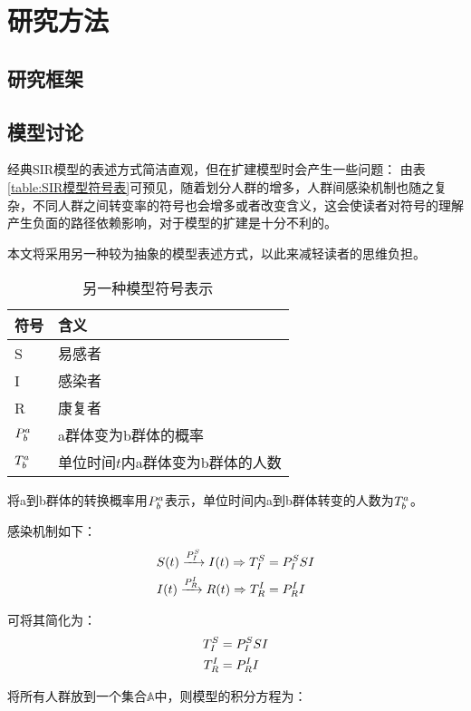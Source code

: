 \section{研究方法}
\subsection{研究框架}
\subsection{模型讨论}
\par 经典SIR模型的表述方式简洁直观，但在扩建模型时会产生一些问题：
由表\ref{table:SIR模型符号表}可预见，随着划分人群的增多，人群间感染机制也随之复杂，不同人群之间转变率的符号也会增多或者改变含义，这会使读者对符号的理解产生负面的路径依赖影响，对于模型的扩建是十分不利的。
\par 本文将采用另一种较为抽象的模型表述方式，以此来减轻读者的思维负担。
\begin{table}[H]
    \centering
    \caption{另一种模型符号表示}
    \begin{tabular}{ll}
        \hline
        符号       & 含义                              \\
        \hline
        S          & 易感者                            \\
        I          & 感染者                            \\
        R          & 康复者                            \\
        $\P{a}{b}$ & a群体变为b群体的概率              \\
        $\T{a}{b}$ & 单位时间$t$内a群体变为b群体的人数 \\
        \hline
    \end{tabular}
\end{table}
\par 将a到b群体的转换概率用$\P{a}{b}$表示，单位时间内a到b群体转变的人数为$\T{a}{b}$。
\par 感染机制如下：
\begin{align}
    S(t)\xrightarrow{\P{S}{I}}I(t) \Rightarrow \TP{S}{I}{SI} \\
    I(t)\xrightarrow{\P{I}{R}}R(t) \Rightarrow \TP{I}{R}{I}
\end{align}
\par 可将其简化为：
\begin{align}
    \TP{S}{I}{SI} \\
    \TP{I}{R}{I}
\end{align}
\par 将所有人群放到一个集合$\mathbb{A}$中，则模型的积分方程为：
